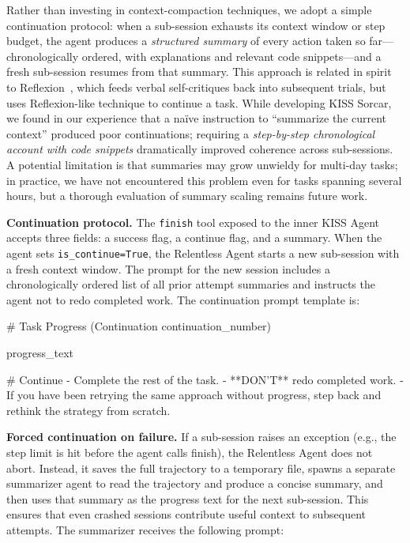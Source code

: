\documentclass{article}
\begin{document}
Rather than investing in context-compaction techniques, we adopt a simple continuation protocol: when a sub-session exhausts its context window or step budget, the agent produces a \emph{structured summary} of every action taken so far---chronologically ordered, with explanations and relevant code snippets---and a fresh sub-session resumes from that summary.  This approach is related in spirit to Reflexion~\citep{shinn2023reflexion}, which feeds verbal self-critiques back into subsequent trials, but uses Reflexion-like technique to continue a task.  While developing KISS Sorcar, we found in our experience that a na\"ive instruction to ``summarize the current context'' produced poor continuations; requiring a \emph{step-by-step chronological account with code snippets} dramatically improved coherence across sub-sessions. A potential limitation is that summaries may grow unwieldy for multi-day tasks; in practice, we have not encountered this problem even for tasks spanning several hours, but a thorough evaluation of summary scaling remains future work.

\textbf{Continuation protocol.}  The \texttt{finish} tool exposed to the inner KISS Agent accepts three fields: a success flag, a continue flag, and a summary.  When the agent sets \texttt{is\_continue=True}, the Relentless Agent starts a new sub-session with a fresh context window.  The prompt for the new session includes a chronologically ordered list of all prior attempt summaries and instructs the agent not to redo completed work.  The continuation prompt template is:

\begin{prompt}
# Task Progress (Continuation {continuation_number})

{progress_text}

# Continue
- Complete the rest of the task.
- **DON'T** redo completed work.
- If you have been retrying the same approach without progress,
  step back and rethink the strategy from scratch.
\end{prompt}

\textbf{Forced continuation on failure.}  If a sub-session raises an exception (e.g., the step limit is hit before the agent calls finish), the Relentless Agent does not abort.  Instead, it saves the full trajectory to a temporary file, spawns a separate summarizer agent to read the trajectory and produce a concise summary, and then uses that summary as the progress text for the next sub-session.  This ensures that even crashed sessions contribute useful context to subsequent attempts.  The summarizer receives the following prompt:
\end{document}

